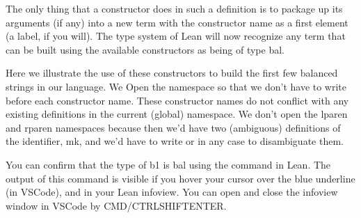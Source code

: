 \documentclass[letterpaper,10pt,english]{sphinxmanual}
\begin{document}
\sphinxAtStartPar
The only thing that a constructor does in such a definition
is to package up its arguments (if any) into a new term with
the constructor name as a first element (a label, if you will).
The type system of Lean will now recognize any term that can
be built using the available constructors as being of type bal.

\sphinxAtStartPar
Here we illustrate the use of these constructors to build the
first few balanced strings in our language. We Open the 
namespace so that we don’t have to write  before each
constructor name. These constructor names do not conflict with
any existing definitions in the current (global) namespace.
We don’t open the lparen and rparen namespaces because then
we’d have two (ambiguous) definitions of the identifier, mk,
and we’d have to write  or  in any case
to disambiguate them.

\begin{sphinxVerbatim}[commandchars=\\\{\}]
 

           

           
           
             
                    
             

               

  
\end{sphinxVerbatim}

\sphinxAtStartPar
You can confirm that the type of b1 is bal using the
 command in Lean. The output of this  command is
visible if you hover your cursor over the blue underline
(in VSCode), and in your Lean infoview. You can open and
close the infoview window in VSCode by CMD/CTRL\sphinxhyphen{}SHIFT\sphinxhyphen{}ENTER.
\end{document}
